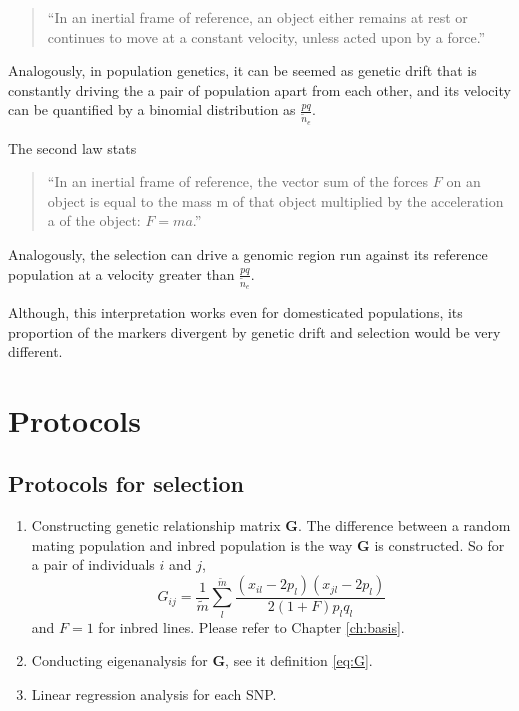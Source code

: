 \documentclass[]{book}
\begin{document}
\begin{quote}
``In an inertial frame of reference, an object either remains at rest or
continues to move at a constant velocity, unless acted upon by a
force.''
\end{quote}

Analogously, in population genetics, it can be seemed as genetic drift
that is constantly driving the a pair of population apart from each
other, and its velocity can be quantified by a binomial distribution as
\(\frac{pq}{\tilde{n}_e}\).

The second law stats

\begin{quote}
``In an inertial frame of reference, the vector sum of the forces \(F\)
on an object is equal to the mass m of that object multiplied by the
acceleration a of the object: \(F = ma\).''
\end{quote}

Analogously, the selection can drive a genomic region run against its
reference population at a velocity greater than
\(\frac{pq}{\tilde{n}_e}\).

Although, this interpretation works even for domesticated populations,
its proportion of the markers divergent by genetic drift and selection
would be very different.

\hypertarget{protocols}{%
\chapter{Protocols}\label{protocols}}

\hypertarget{protocols-for-selection}{%
\section{Protocols for selection}\label{protocols-for-selection}}

\begin{enumerate}
\def\labelenumi{\arabic{enumi}.}
\item
  Constructing genetic relationship matrix \(\mathbf{G}\). The
  difference between a random mating population and inbred population is
  the way \(\mathbf{G}\) is constructed. So for a pair of individuals
  \(i\) and \(j\),
  \[G_{ij}=\frac{1}{\tilde{m}}\sum_l^{\tilde{m}}\frac{(x_{il}-2p_l)(x_{jl}-2p_l)}{2(1+F)p_lq_l}\]
  and \(F=1\) for inbred lines. Please refer to Chapter \ref{ch:basis}.
\item
  Conducting eigenanalysis for \(\mathbf{G}\), see it definition
  \eqref{eq:G}.
\item
  Linear regression analysis for each SNP.
\end{enumerate}
\end{document}
